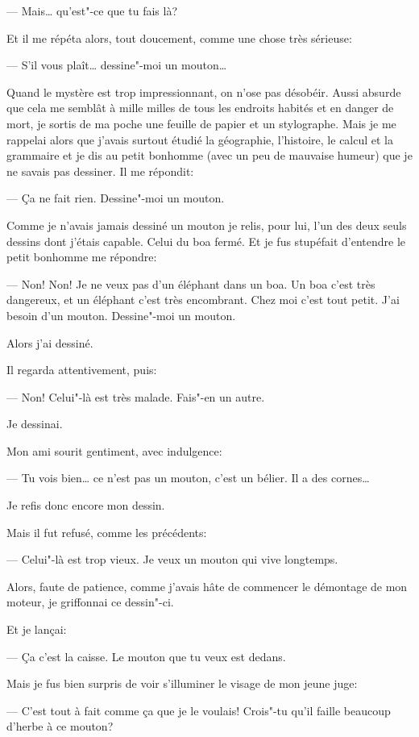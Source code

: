 \begin{Parallel}[p]{}{}
{--- Mais\ldots{} qu'est"-ce que tu fais là?

Et il me répéta alors, tout doucement, comme
une chose très sérieuse:

--- S'il vous plaît\ldots{} dessine"-moi un mouton\ldots{}

Quand le mystère est trop impressionnant, on
n'ose pas désobéir. Aussi absurde que cela me semblât à mille milles de tous les endroits habités et en
danger de mort, je sortis de ma poche une feuille de
papier et un stylographe. Mais je me rappelai alors
que j'avais surtout étudié la géographie, l'histoire, le
calcul et la grammaire et je dis au petit bonhomme
(avec un peu de mauvaise humeur) que je ne savais
pas dessiner. Il me répondit:

--- Ça ne fait rien. Dessine"-moi un mouton.

Comme je n'avais jamais dessiné un mouton je relis, pour lui, l'un des deux seuls dessins dont j'étais capable. Celui du boa fermé. Et je fus stupéfait d'entendre le
petit bonhomme me répondre:

--- Non! Non! Je ne veux pas d'un
éléphant dans un boa. Un boa c'est
très dangereux, et un éléphant c'est très encombrant. Chez moi c'est tout petit. J'ai besoin d'un
mouton. Dessine"-moi un mouton.

Alors j'ai dessiné.

Il regarda attentivement, puis:

--- Non! Celui"-là est très malade. Fais"-en un autre.

Je dessinai.

Mon ami sourit gentiment, avec
indulgence:

--- Tu vois bien\ldots{} ce n'est pas un mouton, c'est un
bélier. Il a des cornes\ldots{}

Je refis donc encore mon dessin.

Mais il fut refusé, comme les précédents:

--- Celui"-là est trop vieux. Je veux un
mouton qui vive longtemps.

Alors, faute de patience, comme
j'avais hâte de commencer le démontage de mon moteur, je griffonnai ce
dessin"-ci.

Et je lançai:

--- Ça c'est la caisse. Le mouton que tu
veux est dedans.

Mais je fus bien surpris de voir s'illuminer le
visage de mon jeune juge:

--- C'est tout à fait comme ça que je le voulais!
Crois"-tu qu'il faille beaucoup d'herbe à ce mouton?

}
\end{Parallel}
